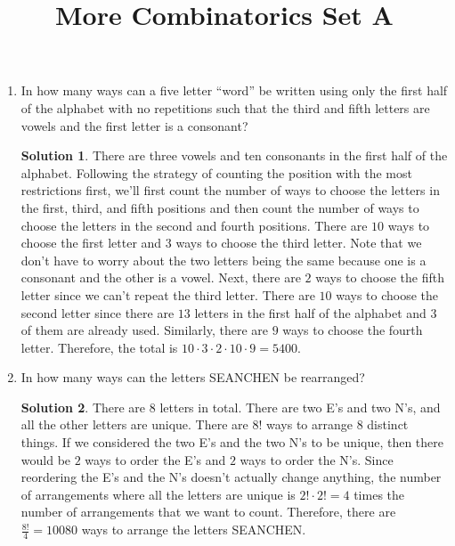 \documentclass[twocolumn]{article}
\title{More Combinatorics Set A}
\date{}
\author{}
\theoremstyle{definition}
\newtheorem*{solution}{Solution}
\begin{document}
\maketitle
\begin{enumerate}
    \item In how many ways can a five letter ``word'' be written using only the 
        first half of the alphabet with no repetitions such that the third and 
        fifth letters are vowels and the first letter is a consonant?
        \begin{solution}
            There are three vowels and ten consonants in the first half of the 
            alphabet. Following the strategy of counting the position with the 
            most restrictions first, we'll first count the number of ways to 
            choose the letters in the first, third, and fifth positions and then 
            count the number of ways to choose the letters in the second and 
            fourth positions. There are $10$ ways to choose the first letter and 
            $3$ ways to choose the third letter. Note that we don't have to 
            worry about the two letters being the same because one is a 
            consonant and the other is a vowel. Next, there are $2$ ways to 
            choose the fifth letter since we can't repeat the third letter. 
            There are $10$ ways to choose the second letter since there are $13$ 
            letters in the first half of the alphabet and $3$ of them are 
            already used. Similarly, there are $9$ ways to choose the fourth 
            letter. Therefore, the total is $10 \cdot 3 \cdot 2 \cdot 10 \cdot 9 
            = 5400$.
        \end{solution}
    \item In how many ways can the letters SEANCHEN be rearranged?
        \begin{solution}
            There are $8$ letters in total. There are two E's and two N's, and 
            all the other letters are unique. There are $8!$ ways to arrange $8$ 
            distinct things. If we considered the two E's and the two N's to be 
            unique, then there would be $2$ ways to order the E's and $2$ ways 
            to order the N's. Since reordering the E's and the N's doesn't 
            actually change anything, the number of arrangements where all the 
            letters are unique is $2! \cdot 2! = 4$ times the number of 
            arrangements that we want to count. Therefore, there are 
            $\frac{8!}{4} = 10080$ ways to arrange the letters SEANCHEN.

\end{solution}
\end{enumerate}
\end{document}
